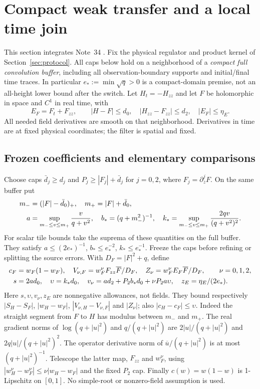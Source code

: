 \section{Compact weak transfer and a local time join}\label{sec:compact-transfer}
This section integrates Note~34 \cite{n34}. Fix the physical regulator
and product kernel of Section~\ref{sec:protocol}. All caps below hold on
a neighborhood of a \emph{compact full convolution buffer}, including
all observation-boundary supports and initial/final time traces. In
particular $e_*:=\min\sqrt q>0$ is a compact-domain premise, not an
all-height lower bound after the switch. Let $H_t=-H_{zz}$ and let $F$
be holomorphic in space and $C^1$ in real time, with
\begin{equation}
 E_F=F_t+F_{zz},\qquad |H-F|\le d_0,\quad
 |H_{zz}-F_{zz}|\le d_2,\quad |E_F|\le\eta_E.
 \label{eq:cj-inputs}
\end{equation}
All needed field derivatives are smooth on that neighborhood. Derivatives
in time are at fixed physical coordinates; the filter is spatial and fixed.

\subsection{Frozen coefficients and elementary comparisons}
Choose caps $\bar d_j\ge d_j$ and $P_j\ge|F_j|+\bar d_j$ for $j=0,2$,
where $F_j=\partial_z^jF$. On the same buffer put
\begin{align}
 m_-&=(|F|-\bar d_0)_+,\quad m_+=|F|+\bar d_0,\notag\\
 a&=\sup_{m_-\le v\le m_+}\frac{v}{q+v^2},\quad
 b_*=(q+m_-^2)^{-1},\quad
 k_*=\sup_{m_-\le v\le m_+}\frac{2qv}{(q+v^2)^2}.
 \label{eq:cj-caps}
\end{align}
For scalar tile bounds take the suprema of these quantities on the full
buffer. They satisfy $a\le(2e_*)^{-1}$, $b_*\le e_*^{-2}$,
$k_*\le e_*^{-1}$. Freeze the caps before refining or splitting the source
errors. With $D_F=|F|^2+q$, define
\begin{align}
 c_F&=w_F(1-w_F),\quad
 V_{\nu,F}=w_F^\nu F_{zz}\overline F/D_F,\quad
 Z_\nu=w_F^\nu E_F\overline F/D_F,\qquad \nu=0,1,2,\notag\\
 s&=2ad_0,\quad \upsilon=k_*d_0,\quad
 v_\nu=ad_2+P_2b_*d_0+\nu P_2a\upsilon,\quad
 z_E=\eta_E/(2e_*).
 \label{eq:cj-elementary}
\end{align}
Here $s,\upsilon,v_\nu,z_E$ are nonnegative allowances, not fields.
They bound respectively $|S_H-S_F|$, $|w_H-w_F|$,
$|V_{\nu,H}-V_{\nu,F}|$ and $|Z_\nu|$; also
$|c_H-c_F|\le\upsilon$.
Indeed the straight segment from $F$ to $H$ has modulus between $m_-$
and $m_+$. The real gradient norms of $\log(q+|u|^2)$ and
$q/(q+|u|^2)$ are $2|u|/(q+|u|^2)$ and
$2q|u|/(q+|u|^2)^2$. The operator derivative norm of
$\overline u/(q+|u|^2)$ is at most $(q+|u|^2)^{-1}$.
Telescope the latter map, $F_{zz}$ and $w_F^\nu$, using
$|w_H^\nu-w_F^\nu|\le\nu|w_H-w_F|$ and the fixed $P_2$ cap.
Finally $c(w)=w(1-w)$ is 1-Lipschitz on $[0,1]$.
No simple-root or nonzero-field assumption is used.

